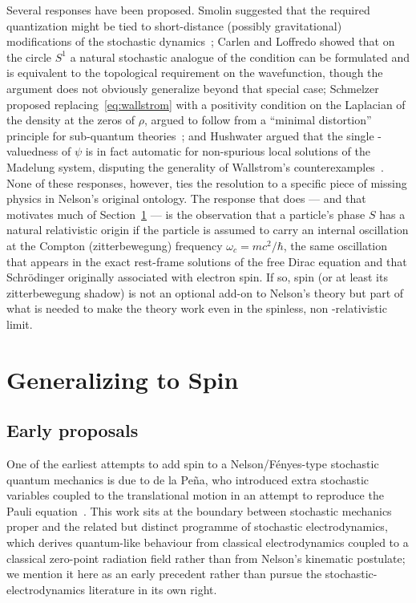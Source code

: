 \documentclass[11pt]{article}
\begin{document}
Several responses have been proposed. Smolin suggested that the required
quantization might be tied to short-distance (possibly gravitational)
modifications of the stochastic dynamics~\cite{smolin86}; Carlen and
Loffredo showed that on the circle $S^1$ a natural stochastic analogue of
the condition can be formulated and is equivalent to the topological
requirement on the wavefunction, though the argument does not obviously
generalize beyond that special case; Schmelzer proposed 
replacing~\eqref{eq:wallstrom} with a positivity condition on the 
Laplacian of the density at the zeros of $\rho$, argued to follow from a
``minimal distortion'' principle for sub-quantum
theories~\cite{schmelzer2011}; and Hushwater argued that the single
-valuedness of $\psi$ is in fact automatic for non-spurious local solutions
of the Madelung system, disputing the generality of Wallstrom's
counterexamples~\cite{hushwater2010}. None of these responses, however,
ties the resolution to a specific piece of missing physics in Nelson's
original ontology. The response that does --- and that motivates much of
Section~\ref{sec:spin} --- is the observation that a particle's phase $S$
has a natural relativistic origin if the particle is assumed to carry an
internal oscillation at the Compton (zitterbewegung) frequency 
$\omega_c = mc^2/\hbar$, the same oscillation that appears in the exact
rest-frame solutions of the free Dirac equation and that Schr\"odinger
originally associated with electron spin. If so, spin (or at least its
zitterbewegung shadow) is not an optional add-on to Nelson's theory but
part of what is needed to make the theory work even in the spinless, non
-relativistic limit.

\section{Generalizing to Spin}\label{sec:spin}

\subsection{Early proposals}

One of the earliest attempts to add spin to a Nelson/Fényes-type stochastic
quantum mechanics is due to de la Peña, who introduced extra stochastic
variables coupled to the translational motion in an attempt to reproduce
the Pauli equation~\cite{delapena70}. This work sits at the boundary
between stochastic mechanics proper and the related but distinct programme
of stochastic electrodynamics, which derives quantum-like behaviour from
classical electrodynamics coupled to a classical zero-point radiation field
rather than from Nelson's kinematic postulate; we mention it here as an
early precedent rather than pursue the stochastic-electrodynamics
literature in its own right.
\end{document}
